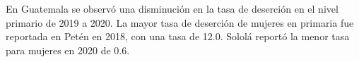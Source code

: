 \justifying En Guatemala se observó una disminución en la tasa de deserción en el nivel primario de 2019 a 2020. La mayor tasa de deserción de mujeres en primaria fue reportada en Petén en 2018, con una tasa de 12.0. Sololá reportó la menor tasa para mujeres en 2020 de 0.6. 